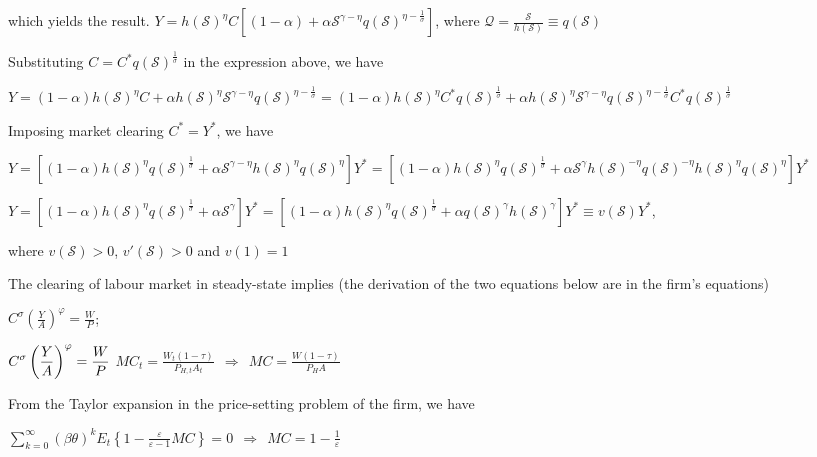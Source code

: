 \documentclass[
]{article}
\begin{document}
which yields the result.
\(\displaystyle Y= h(\mathcal{S})^{\eta}C \left[ (1-\alpha) + \alpha \mathcal{S}^{\gamma-\eta} q(\mathcal{S})^{\eta-\frac{1}{\sigma}} \right]\),
where
\(\displaystyle \mathcal{Q}=\frac{\mathcal{S}}{h(\mathcal{S})} \equiv q(\mathcal{S})\)

Substituting \(\displaystyle C = C^*q(\mathcal{S})^\frac{1}{\sigma}\) in
the expression above, we have

\(\displaystyle Y= (1-\alpha)h(\mathcal{S})^{\eta}C + \alpha h(\mathcal{S})^{\eta} \mathcal{S}^{\gamma-\eta} q(\mathcal{S})^{\eta-\frac{1}{\sigma}} = (1-\alpha)h(\mathcal{S})^{\eta} C^*q(\mathcal{S})^\frac{1}{\sigma} + \alpha h(\mathcal{S})^{\eta} \mathcal{S}^{\gamma-\eta} q(\mathcal{S})^{\eta-\frac{1}{\sigma}} C^*q(\mathcal{S})^\frac{1}{\sigma}\)

Imposing market clearing \(C^*=Y^*\), we have

\(\displaystyle Y=\left[ (1-\alpha)h(\mathcal{S})^{\eta} q(\mathcal{S})^\frac{1}{\sigma} + \alpha \mathcal{S}^{\gamma-\eta} h(\mathcal{S})^{\eta} q(\mathcal{S})^{\eta} \right]Y^* = \left[ (1-\alpha)h(\mathcal{S})^{\eta} q(\mathcal{S})^\frac{1}{\sigma} + \alpha \mathcal{S}^{\gamma} h(\mathcal{S})^{-\eta} q(\mathcal{S})^{-\eta} h(\mathcal{S})^{\eta} q(\mathcal{S})^{\eta} \right]Y^*\)

\(\displaystyle Y= \left[ (1-\alpha)h(\mathcal{S})^{\eta} q(\mathcal{S})^\frac{1}{\sigma} + \alpha \mathcal{S}^{\gamma} \right]Y^* = \left[ (1-\alpha)h(\mathcal{S})^{\eta} q(\mathcal{S})^\frac{1}{\sigma} + \alpha q(\mathcal{S})^{\gamma} h(\mathcal{S})^{\gamma} \right]Y^* \equiv v (\mathcal{S})Y^*\),

where \(v (\mathcal{S})>0\), \(v' (\mathcal{S})>0\) and \(v (1)=1\)

The clearing of labour market in steady-state implies (the derivation of
the two equations below are in the firm's equations)

\(\displaystyle C^\sigma \left( \frac{Y}{A} \right)^\varphi= \frac{W}{P}\);

\(\displaystyle\displaystyle C^\sigma \left( \frac{Y}{A} \right)^\varphi= \frac{W}{P}\)
\(\displaystyle MC_t = \frac{W_t(1-\tau)}{P_{H,t} A_t} \ \ \Rightarrow \ \  MC = \frac{W(1-\tau)}{P_{H} A}\)

From the Taylor expansion in the price-setting problem of the firm, we
have

\(\displaystyle \sum_{k=0}^\infty (\beta \theta)^kE_t \left\{ 1-\frac{\varepsilon}{\varepsilon-1} MC \right\}=0 \ \ \Rightarrow \ \ MC=1-\frac{1}{\varepsilon}\)
\end{document}
